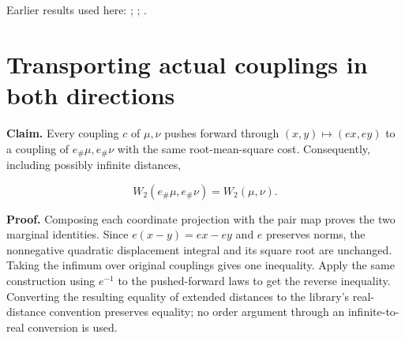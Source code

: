 \documentclass[11pt,a4paper]{article}
\begin{document}
Earlier results used here: \cite[Section~3.26.1]{LangevinLean2026ULASC}; \cite[Section~3.26.2]{LangevinLean2026ULASC}; \cite[Section~3.26.3]{LangevinLean2026ULASC}.

\section{\texorpdfstring{Transporting actual couplings in both directions}{Transporting actual couplings in both directions}}


\textbf{Claim.} Every coupling \(c\) of \(\mu,\nu\) pushes forward through \((x,y)\mapsto(e x,e y)\) to a coupling of \(e_\#\mu,e_\#\nu\) with the same root-mean-square cost. Consequently, including possibly infinite distances,

\[W_2(e_\#\mu,e_\#\nu)=W_2(\mu,\nu).\]


\textbf{Proof.} Composing each coordinate projection with the pair map proves the two marginal identities. Since \(e(x-y)=e x-e y\) and \(e\) preserves norms, the nonnegative quadratic displacement integral and its square root are unchanged. Taking the infimum over original couplings gives one inequality. Apply the same construction using \(e^{-1}\) to the pushed-forward laws to get the reverse inequality. Converting the resulting equality of extended distances to the library's real-distance convention preserves equality; no order argument through an infinite-to-real conversion is used.
\end{document}
